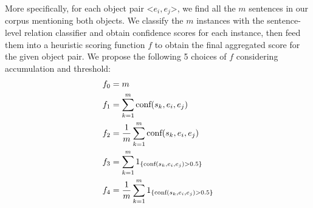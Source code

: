 More specifically, for each object pair \textless$e_i,e_j$\textgreater, 
we find all the $m$ sentences in our corpus mentioning both objects.
We classify the $m$ instances with the sentence-level relation classifier and obtain confidence scores for each instance, then
feed them into a heuristic scoring function $f$ to obtain the final aggregated score for the given object pair. 
We propose the following 5 choices of $f$ considering accumulation and threshold:
\begin{align}
	f_0&=m\\
	f_1&=\sum_{k=1}^{m}\textnormal{conf}(s_k,e_i,e_j)\\
	f_2&=\frac{1}{m}\sum_{k=1}^{m}\textnormal{conf}(s_k,e_i,e_j)\\
	f_3&=\sum_{k=1}^{m}1_{\{\textnormal{conf}(s_k,e_i,e_j)>0.5\}} \\
	f_4&=\frac{1}{m}\sum_{k=1}^{m}1_{ \{ \textnormal{conf}(s_k,e_i,e_j)>0.5 \}}
\end{align}
